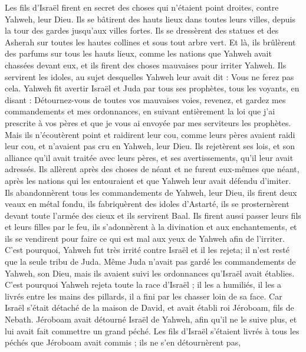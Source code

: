 \begin{multicols}{2}
Les fils d'Israël firent en secret des choses qui n'étaient point droites, contre Yahweh, leur Dieu. Ils se bâtirent des hauts lieux dans toutes leurs villes, depuis la tour des gardes jusqu'aux villes fortes.
Ils se dressèrent des statues et des Asherah sur toutes les hautes collines et sous tout arbre vert.
Et là, ils brûlèrent des parfums sur tous les hauts lieux, comme les nations que Yahweh avait chassées devant eux, et ils firent des choses mauvaises pour irriter Yahweh.
Ils servirent les idoles, au sujet desquelles Yahweh leur avait dit : Vous ne ferez pas cela.
Yahweh fit avertir Israël et Juda par tous ses prophètes, tous les voyants, en disant : Détournez-vous de toutes vos mauvaises voies, revenez, et gardez mes commandements et mes ordonnances, en suivant entièrement la loi que j'ai prescrite à vos pères et que je vous ai envoyée par mes serviteurs les prophètes.
Mais ils n'écoutèrent point et raidirent leur cou, comme leurs pères avaient raidi leur cou, et n'avaient pas cru en Yahweh, leur Dieu.
Ils rejetèrent ses lois, et son alliance qu'il avait traitée avec leurs pères, et ses avertissements, qu'il leur avait adressés. Ils allèrent après des choses de néant et ne furent eux-mêmes que néant, après les nations qui les entouraient et que Yahweh leur avait défendu d'imiter.
Ils abandonnèrent tous les commandements de Yahweh, leur Dieu, ils firent deux veaux en métal fondu, ils fabriquèrent des idoles d'Astarté, ils se prosternèrent devant toute l'armée des cieux et ils servirent Baal.
Ils firent aussi passer leurs fils et leurs filles par le feu, ils s'adonnèrent à la divination et aux enchantements, et ils se vendirent pour faire ce qui est mal aux yeux de Yahweh afin de l'irriter.
C'est pourquoi, Yahweh fut très irrité contre Israël et il les rejeta; il n'est resté que la seule tribu de Juda.
Même Juda n'avait pas gardé les commandements de Yahweh, son Dieu, mais ils avaient suivi les ordonnances qu'Israël avait établies.
C'est pourquoi Yahweh rejeta toute la race d'Israël ; il les a humiliés, il les a livrés entre les mains des pillards, il a fini par les chasser loin de sa face.
Car Israël s'était détaché de la maison de David, et avait établi roi Jéroboam, fils de Nebath. Jéroboam avait détourné Israël de Yahweh, afin qu'il ne le suive plus, et lui avait fait commettre un grand péché.
Les fils d'Israël s'étaient livrés à tous les péchés que Jéroboam avait commis ; ils ne s'en détournèrent pas,

\end{multicols}
